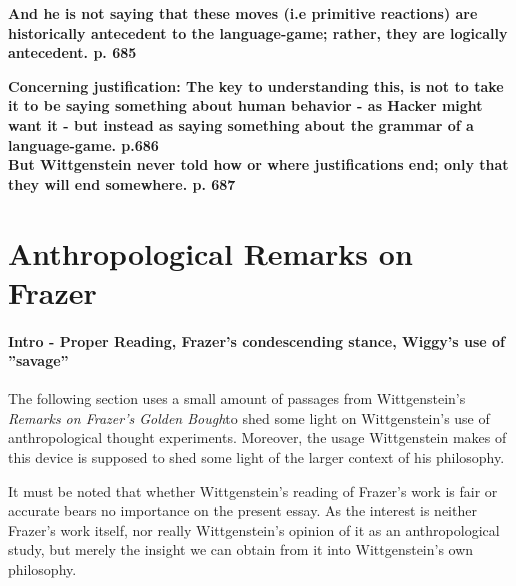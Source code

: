 \documentclass{article}
\begin{document}
\textbf{And he is not saying that these moves (i.e primitive reactions) are historically antecedent to the language-game; rather, they are logically antecedent. p. 685}

\textbf{Concerning justification: The key to understanding this, is not to take it to be saying something about human behavior - as Hacker might want it - but instead as saying something about the grammar of a language-game. p.686\\
But Wittgenstein never told how or where justifications end; only that they will end somewhere. p. 687}

\section{Anthropological Remarks on Frazer}
\paragraph{Intro - Proper Reading, Frazer's condescending stance, Wiggy's use of ''savage''}
The following section uses a small amount of passages from Wittgenstein's \textit{Remarks on Frazer's Golden Bough}to shed some light on Wittgenstein's use of anthropological thought experiments. Moreover, the usage Wittgenstein makes of this device is supposed to shed some light of the larger context of his philosophy. 

It must be noted that whether Wittgenstein's reading of Frazer's work is fair or accurate bears no importance on the present essay. As the interest is neither Frazer's work itself, nor really Wittgenstein's opinion of it as an anthropological study, but merely the insight we can obtain from it into Wittgenstein's own philosophy. 
\end{document}
